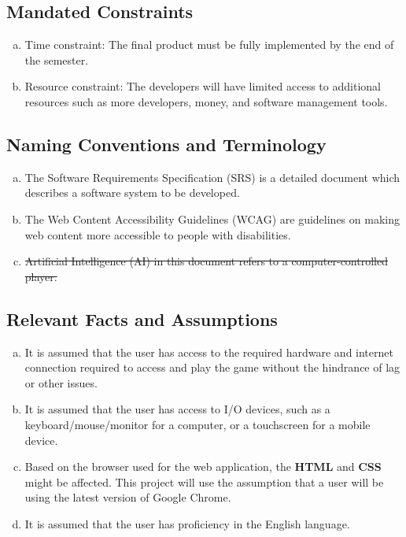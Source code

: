 \documentclass[12pt, titlepage]{article}
\begin{document}
    \subsection{Mandated Constraints}
        \begin{enumerate}[a)]
        	\item Time constraint: The final product must be fully implemented by the end of the semester.
        	\item Resource constraint: The developers will have limited access to additional resources such as more developers, money, and software management tools.
        \end{enumerate}
        
    \subsection{Naming Conventions and Terminology}
        \begin{enumerate}[a)]
        	\item The Software Requirements Specification (SRS) is a detailed document which describes a software system to be developed.
        	
        	\item The Web Content Accessibility Guidelines (WCAG) \cite{WCAG} are guidelines on making web content more accessible to people with disabilities.
        	
        	\item \sout{Artificial Intelligence (AI) in this document refers to a computer-controlled player.}
        \end{enumerate}
        
    \subsection{Relevant Facts and Assumptions}
        \begin{enumerate}[a)]
            \item It is assumed that the user has access to the required hardware and internet connection required to access and play the game without the hindrance of lag or other issues.
            
            \item It is assumed that the user has access to I/O devices, such as a keyboard/mouse/monitor for a computer, or a touchscreen for a mobile device.
            
        	\item Based on the browser used for the web application, the  \textbf{HTML} and  \textbf{CSS} might be affected. This project will use the assumption that a user will be using the latest version of Google Chrome.
        	
        	\item It is assumed that the user has proficiency in the English language.
        \end{enumerate}
    
\end{document}

